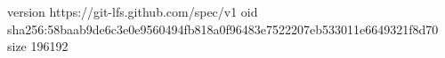 version https://git-lfs.github.com/spec/v1
oid sha256:58baab9de6c3e0e9560494fb818a0f96483e7522207eb533011e6649321f8d70
size 196192

